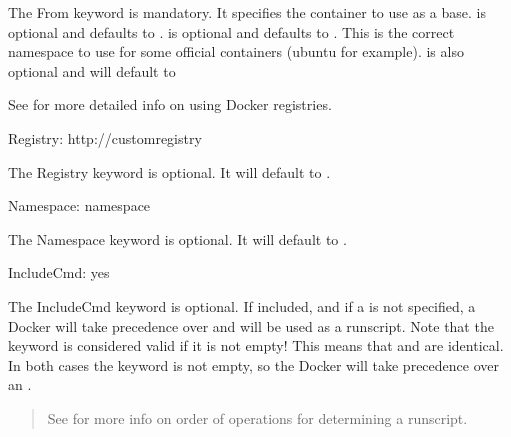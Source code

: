 \documentclass[letterpaper,10pt,english]{sphinxmanual}
\begin{document}
The From keyword is mandatory. It specifies the container to use as a base.  is optional and defaults to .
 is optional and defaults to . This is the correct namespace to use for some official containers (ubuntu for example).
 is also optional and will default to 

See {\hyperref[\detokenize{singularity_and_docker:singularity-and-docker}]{}} for more detailed info on using Docker registries.

%
\begin{sphinxVerbatim}[commandchars=\\\{\}]
Registry: http://custom\PYGZus{}registry
\end{sphinxVerbatim}

The Registry keyword is optional. It will default to .

%
\begin{sphinxVerbatim}[commandchars=\\\{\}]
Namespace: namespace
\end{sphinxVerbatim}

The Namespace keyword is optional. It will default to .

%
\begin{sphinxVerbatim}[commandchars=\\\{\}]
IncludeCmd: yes
\end{sphinxVerbatim}

The IncludeCmd keyword is optional. If included, and if a  is not specified, a Docker  will take precedence over 
and will be used as a runscript. Note that the  keyword is considered valid if it is not empty! This means that  and  are identical. In both cases the  keyword is not empty, so the Docker  will take precedence over an .
\begin{quote}

See {\hyperref[\detokenize{singularity_and_docker:singularity-and-docker}]{}} for more info on order of operations for determining a runscript.
\end{quote}
\end{document}

